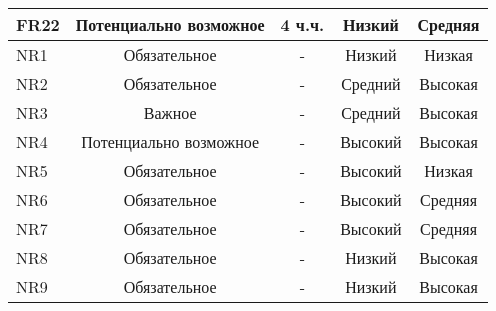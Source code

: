 \begin{longtable}{|l|c|c|c|c|}
    \hline FR22 & Потенциально возможное &  4 ч.ч. & Низкий & Средняя \\
    \hline NR1  & Обязательное & -       & Низкий & Низкая \\
    \hline NR2  & Обязательное & -       & Средний & Высокая \\
    \hline NR3  & Важное       & -       & Средний & Высокая \\
    \hline NR4  & Потенциально возможное & -       & Высокий & Высокая \\
    \hline NR5  & Обязательное & -       & Высокий & Низкая \\
    \hline NR6  & Обязательное & -       & Высокий & Средняя \\
    \hline NR7  & Обязательное & -       & Высокий & Средняя \\
    \hline NR8  & Обязательное & -       & Низкий & Высокая \\
    \hline NR9  & Обязательное & -       & Низкий & Высокая \\
    \hline
\end{longtable}
